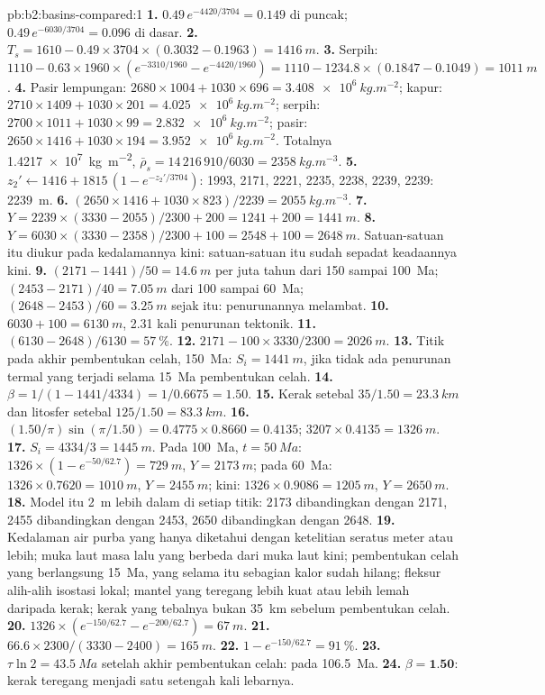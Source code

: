\begin{solution}{pb:b2:basins-compared:1}
\textbf{1.} $0.49\,e^{-4420/3704} = 0.149$ di puncak; $0.49\,e^{-6030/3704} = 0.096$ di dasar.
\textbf{2.} $T_s = 1610 - 0.49\times3704\times(0.3032 - 0.1963) = \qty{1416}{m}$.
\textbf{3.} Serpih: $1110 - 0.63\times1960\times(e^{-3310/1960} - e^{-4420/1960}) = 1110 - 1234.8
\times(0.1847 - 0.1049) = \qty{1011}{m}$.
\textbf{4.} Pasir lempungan: $2680\times1004 + 1030\times696 = \qty{3.408e6}{kg.m^{-2}}$; kapur:
$2710\times1409 + 1030\times201 = \qty{4.025e6}{kg.m^{-2}}$; serpih: $2700\times1011 + 1030\times99 =
\qty{2.832e6}{kg.m^{-2}}$; pasir: $2650\times1416 + 1030\times194 = \qty{3.952e6}{kg.m^{-2}}$. Totalnya
\qty{1.4217e7}{kg.m^{-2}}, $\bar\rho_s = 14\,216\,910/6030 = \qty{2358}{kg.m^{-3}}$.
\textbf{5.} $z_2' \leftarrow 1416 + 1815\,(1 - e^{-z_2'/3704})$: 1993, 2171, 2221, 2235, 2238, 2239,
2239: \qty{2239}{m}.
\textbf{6.} $(2650\times1416 + 1030\times823)/2239 = \qty{2055}{kg.m^{-3}}$.
\textbf{7.} $Y = 2239\times(3330 - 2055)/2300 + 200 = 1241 + 200 = \qty{1441}{m}$.
\textbf{8.} $Y = 6030\times(3330 - 2358)/2300 + 100 = 2548 + 100 = \qty{2648}{m}$. Satuan-satuan itu
diukur pada kedalamannya kini: satuan-satuan itu sudah sepadat keadaannya kini.
\textbf{9.} $(2171 - 1441)/50 = \qty{14.6}{m}$ per juta tahun dari 150 sampai \qty{100}{Ma};
$(2453 - 2171)/40 = \qty{7.05}{m}$ dari 100 sampai \qty{60}{Ma}; $(2648 - 2453)/60 = \qty{3.25}{m}$
sejak itu: penurunannya melambat.
\textbf{10.} $6030 + 100 = \qty{6130}{m}$, 2.31 kali penurunan tektonik.
\textbf{11.} $(6130 - 2648)/6130 = \qty{57}{\percent}$.
\textbf{12.} $2171 - 100\times3330/2300 = \qty{2026}{m}$.
\textbf{13.} Titik pada akhir pembentukan celah, \qty{150}{Ma}: $S_i = \qty{1441}{m}$, jika tidak ada penurunan
termal yang terjadi selama \qty{15}{Ma} pembentukan celah.
\textbf{14.} $\beta = 1/(1 - 1441/4334) = 1/0.6675 = 1.50$.
\textbf{15.} Kerak setebal $35/1.50 = \qty{23.3}{km}$ dan litosfer setebal $125/1.50 = \qty{83.3}{km}$.
\textbf{16.} $(1.50/\pi)\sin(\pi/1.50) = 0.4775\times0.8660 = 0.4135$; $3207\times0.4135 =
\qty{1326}{m}$.
\textbf{17.} $S_i = 4334/3 = \qty{1445}{m}$. Pada \qty{100}{Ma}, $t = \qty{50}{Ma}$: $1326\times(1 -
e^{-50/62.7}) = \qty{729}{m}$, $Y = \qty{2173}{m}$; pada \qty{60}{Ma}: $1326\times0.7620 =
\qty{1010}{m}$, $Y = \qty{2455}{m}$; kini: $1326\times0.9086 = \qty{1205}{m}$, $Y = \qty{2650}{m}$.
\textbf{18.} Model itu \qty{2}{m} lebih dalam di setiap titik: 2173 dibandingkan dengan 2171, 2455 dibandingkan dengan 2453,
2650 dibandingkan dengan 2648.
\textbf{19.} Kedalaman air purba yang hanya diketahui dengan ketelitian seratus meter atau lebih; muka laut masa lalu
yang berbeda dari muka laut kini; pembentukan celah yang berlangsung \qty{15}{Ma}, yang selama itu sebagian kalor
sudah hilang; fleksur alih-alih isostasi lokal; mantel yang teregang lebih kuat atau lebih lemah daripada kerak;
kerak yang tebalnya bukan \qty{35}{km} sebelum pembentukan celah.
\textbf{20.} $1326\times(e^{-150/62.7} - e^{-200/62.7}) = \qty{67}{m}$.
\textbf{21.} $66.6\times2300/(3330 - 2400) = \qty{165}{m}$.
\textbf{22.} $1 - e^{-150/62.7} = \qty{91}{\percent}$.
\textbf{23.} $\tau\ln2 = \qty{43.5}{Ma}$ setelah akhir pembentukan celah: pada \qty{106.5}{Ma}.
\textbf{24.} $\beta = \textbf{1.50}$: kerak teregang menjadi satu setengah kali lebarnya.
\end{solution}

